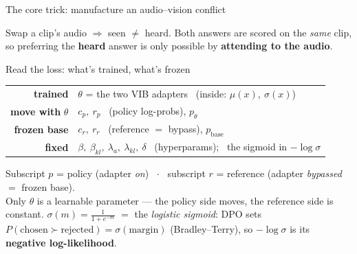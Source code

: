 \documentclass[aspectratio=169,11pt]{beamer}
\begin{document}
\begin{frame}{The core trick: manufacture an audio--vision conflict}
\centering
{}
\vfill
\small Swap a clip's audio $\Rightarrow$ seen $\neq$ heard. Both answers are scored on the \emph{same} clip,
so preferring the \textbf{heard} answer is only possible by \textbf{attending to the audio}.
\end{frame}

\begin{frame}{Read the loss: what's trained, what's frozen}
\centering
\renewcommand{\arraystretch}{1.35}
\begin{tabular}{@{}r@{\quad}l@{}}
\textcolor{trn}{\textbf{trained}}        & $\theta$ = the two VIB adapters \ (inside: $\mu(x),\ \sigma(x)$) \\
\textcolor{trn}{\textbf{move with }$\theta$} & $c_p,\ r_p$ \ (policy log-probs), \quad $p_\theta$ \\
\textcolor{frz}{\textbf{frozen base}}     & $c_r,\ r_r$ \ (reference $=$ bypass), \quad $p_{\text{base}}$ \\
\textbf{fixed}                            & $\beta,\ \beta_{kl},\ \lambda_a,\ \lambda_{kl},\ \delta$ \ (hyperparams); \ the sigmoid in $-\log\sigma$ \\
\end{tabular}
\vfill
{\small Subscript $p$ = \textcolor{trn}{policy} (adapter \emph{on}) \ $\cdot$ \ subscript $r$ = \textcolor{frz}{reference} (adapter \emph{bypassed} $=$ frozen base).\\
Only $\theta$ is a learnable parameter --- the \textcolor{trn}{policy side} moves, the \textcolor{frz}{reference side} is constant.}
\vspace{0.3em}
{\small $\sigma(m)=\tfrac{1}{1+e^{-m}}$ $=$ the \emph{logistic sigmoid}: DPO sets
$P(\text{chosen}\succ\text{rejected})=\sigma(\text{margin})$ (Bradley--Terry), so
$-\log\sigma$ is its \textbf{negative log-likelihood}.}
\end{frame}
\end{document}
